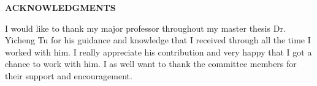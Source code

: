 \documentclass[11pt,a4paper]{report}
\begin{document}
\clearpage

\pagestyle{plain}
\centering
\textbf{ACKNOWLEDGMENTS}
\vspace{0.5cm}

\begin{flushleft}
\hspace{3em} I would like to thank my major professor throughout my master thesis Dr. Yicheng Tu for his guidance and knowledge that I received through all the time I worked with him. I really appreciate his contribution and very happy that I got a chance to work with him. I as well want to thank the committee members for their support and encouragement.
\end{flushleft}

\clearpage
\restoregeometry

\tableofcontents

\clearpage
\end{document}
